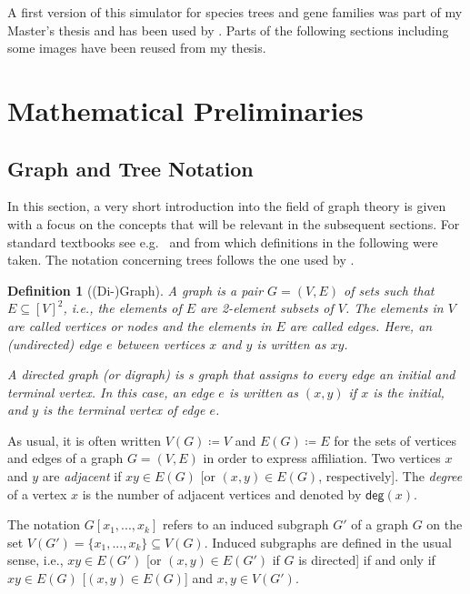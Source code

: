 \documentclass[hidelinks,11pt]{scrreprt}
\newtheorem{definition}[theorem]{Definition}
\newcommand{\degree}{\mathsf{deg}}
\begin{document}
A first version of this simulator for species trees and gene families was part of my Master's thesis \citep{schaller2019} and has been used by \citet{stadler2020}.
Parts of the following sections including some images have been reused from my thesis.

\section{Mathematical Preliminaries}
\label{sec:prelim}

\subsection{Graph and Tree Notation}
In this section, a very short introduction into the field of graph theory is given with a focus on the concepts that will be relevant in the subsequent sections.
For standard textbooks see e.g.\ \cite{diestel2017} and \citet{semple2003} from which definitions in the following were taken. The notation concerning trees follows the one used by \citet{geiss2019a}.

\begin{definition}[(Di-)Graph]
	A \emph{graph} is a pair $G=(V,E)$ of sets such that $E \subseteq [V]^2$, i.e., the elements of $E$ are 2-element subsets of $V$. The elements in $V$ are called vertices or nodes and the elements in $E$ are called edges. Here, an (undirected) edge $e$ between vertices $x$ and $y$ is written as $xy$.
	
	A \emph{directed graph} (or \emph{digraph}) is s graph that assigns to every edge an initial and terminal vertex. In this case, an edge $e$ is written as $(x,y)$ if $x$ is the initial, and $y$ is the terminal vertex of edge $e$.
\end{definition}

As usual, it is often written $V(G)\coloneqq V$ and $E(G)\coloneqq E$ for the sets of vertices and edges of a graph $G=(V,E)$ in order to express affiliation. Two vertices $x$ and $y$ are \emph{adjacent} if $xy\in E(G)$ [or $(x,y)\in E(G)$, respectively]. The \emph{degree} of a vertex $x$ is the number of adjacent vertices and denoted by $\degree(x)$.

The notation $G[x_1,...,x_k]$ refers to an induced subgraph $G'$ of a graph $G$ on the set $V(G')=\{x_1,...,x_k\}\subseteq V(G)$. Induced subgraphs are defined in the usual sense, i.e., $xy\in E(G')$ [or $(x,y)\in E(G')$ if $G$ is directed] if and only if $xy\in E(G)$ [$(x,y)\in E(G)$] and $x,y\in V(G')$.
\end{document}
